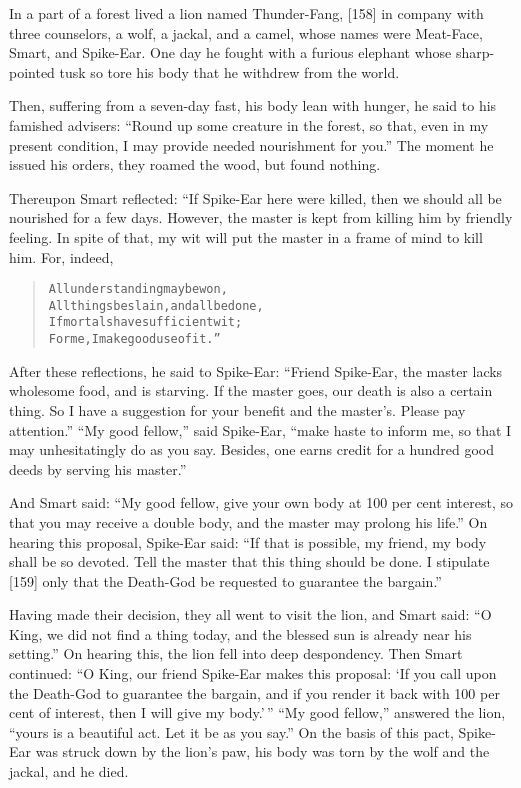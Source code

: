 \documentclass[article, twoside, 14pt]{memoir}
\renewenvironment{verbatim}{%
\begin{quote}%
\vskip -10pt%
\begin{alltt}\normalfont\large}{\end{alltt}%
\end{quote}%
\vskip -10pt
} %
\begin{document}
In a part of a forest lived a lion named Thunder-Fang, [158] in
company with three counselors, a wolf, a jackal, and a camel, whose
names were Meat-Face, Smart, and Spike-Ear. One day he fought with
a furious elephant whose sharp-pointed tusk so tore his body that
he withdrew from the world.

Then, suffering from a seven-day fast, his body lean with hunger,
he said to his famished advisers:
``Round up some creature in the forest, so that, even in my present condition, I may provide needed nourishment for you.''
The moment he issued his orders, they roamed the wood, but found
nothing.

Thereupon Smart reflected: “If Spike-Ear here were killed, then we
should all be nourished for a few days. However, the master is kept
from killing him by friendly feeling. In spite of that, my wit will
put the master in a frame of mind to kill him. For, indeed,

\begin{verbatim}
All understanding may be won,
All things be slain, and all be done,
If mortals have sufficient wit;
For me, I make good use of it.”
\end{verbatim}
After these reflections, he said to Spike-Ear:
``Friend Spike-Ear, the master lacks wholesome food, and is starving. If the master goes, our death is also a certain thing. So I have a suggestion for your benefit and the master's. Please pay attention.''
``My good fellow,'' said Spike-Ear,
``make haste to inform me, so that I may unhesitatingly do as you say. Besides, one earns credit for a hundred good deeds by serving his master.''

And Smart said:
``My good fellow, give your own body at 100 per cent interest, so that you may receive a double body, and the master may prolong his life.''
On hearing this proposal, Spike-Ear said:
``If that is possible, my friend, my body shall be so devoted. Tell the master that this thing should be done. I stipulate [159] only that the Death-God be requested to guarantee the bargain.''

Having made their decision, they all went to visit the lion, and
Smart said:
``O King, we did not find a thing today, and the blessed sun is already near his setting.''
On hearing this, the lion fell into deep despondency. Then Smart
continued:
``O King, our friend Spike-Ear makes this proposal: `If you call upon the Death-God to guarantee the bargain, and if you render it back with 100 per cent of interest, then I will give my body.'\,''
``My good fellow,'' answered the lion,
``yours is a beautiful act. Let it be as you say.'' On the basis of
this pact, Spike-Ear was struck down by the lion's paw, his body
was torn by the wolf and the jackal, and he died.
\end{document}
